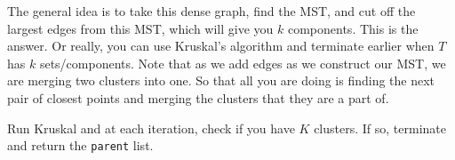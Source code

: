 \documentclass{article}
\begin{document}
      \begin{algo}
        The general idea is to take this dense graph, find the MST, and cut off the largest edges from this MST, which will give you $k$ components. This is the answer. Or really, you can use Kruskal's algorithm and terminate earlier when $T$ has $k$ sets/components. 
        Note that as we add edges as we construct our MST, we are merging two clusters into one. So that all you are doing is finding the next pair of closest points and merging the clusters that they are a part of. 

        \begin{algorithm}[H]
          \label{alg:clustering}
          \begin{algorithmic}[1]
              \State Run Kruskal and at each iteration, check if you have $K$ clusters. 
              \State If so, terminate and return the \texttt{parent} list. 
            \EndFunction
          \end{algorithmic}
        \end{algorithm}
      \end{algo}
\end{document}
